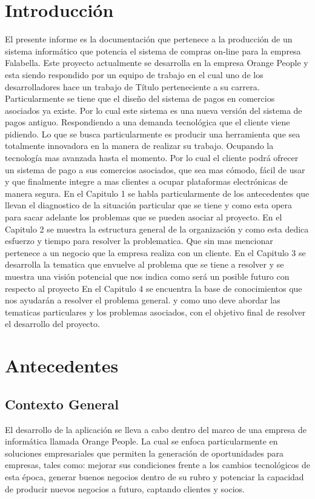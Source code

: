 \documentclass[a4paper,12pt,openany,oneside]{book}
\begin{document}
\chapter*{Introducción}
\thispagestyle{empty}
El presente informe es la documentación que pertenece a la producción de un sistema informático que potencia el sistema de compras on-line para la empresa Falabella. Este proyecto actualmente se desarrolla en la empresa Orange People y esta siendo respondido por un equipo de trabajo en el cual uno de los desarrolladores hace un trabajo de Título perteneciente a su carrera. 
Particularmente se tiene que el diseño del sistema de pagos en comercios asociados ya existe. Por lo cual este sistema es una nueva versión del sistema de pagos antiguo. Respondiendo a una demanda tecnológica que el cliente viene pidiendo.
Lo que se busca particularmente es producir una herramienta que sea totalmente innovadora en la manera de realizar su trabajo. Ocupando la tecnología mas avanzada hasta el momento.
Por lo cual el cliente podrá ofrecer un sistema de pago a sus comercios asociados, que sea mas cómodo, fácil de usar  y que finalmente integre a mas clientes a ocupar plataformas electrónicas  de manera segura.
En el Capitulo 1 se habla particularmente de los antecedentes que llevan el diagnostico de la situación particular que se tiene y como esta opera para sacar adelante los problemas que se pueden asociar al proyecto.
En el Capitulo 2 se muestra la estructura general de la organización y como esta dedica esfuerzo y tiempo para resolver la problematica. Que sin mas mencionar pertenece a un negocio que la empresa realiza con un cliente.
En el Capitulo 3 se desarrolla la tematica que envuelve al problema que se tiene a resolver y se muestra una visión potencial que nos indica como será un posible futuro con respecto al proyecto
En el Capitulo 4 se encuentra la base de conocimientos que nos ayudarán a resolver el problema general. y como uno deve abordar las tematicas particulares y los problemas asociados, con el objetivo final de resolver el desarrollo del proyecto.
\chapter{Antecedentes}
\thispagestyle{empty}
\section{Contexto General}
El desarrollo de la aplicación se lleva a cabo dentro del marco de una empresa de informática llamada Orange People. La cual se enfoca particularmente en soluciones empresariales que permiten la generación de oportunidades para empresas, tales como: mejorar sus condiciones frente a los cambios tecnológicos de esta época, generar buenos negocios dentro de su rubro y potenciar la capacidad de producir nuevos negocios a futuro, captando clientes y socios.
\end{document}
